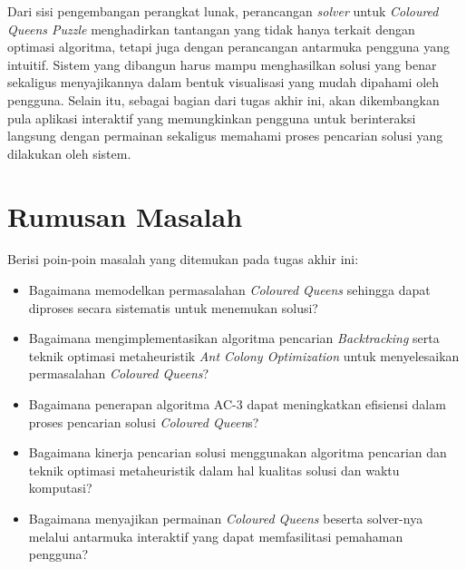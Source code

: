 \documentclass[12pt,a4paper]{article}
\begin{document}
	Dari sisi pengembangan perangkat lunak, perancangan \textit{solver} untuk \textit{Coloured Queens Puzzle} menghadirkan tantangan yang tidak hanya terkait dengan optimasi algoritma, tetapi juga dengan perancangan antarmuka pengguna yang intuitif. Sistem yang dibangun harus mampu menghasilkan solusi yang benar sekaligus menyajikannya dalam bentuk visualisasi yang mudah dipahami oleh pengguna. Selain itu, sebagai bagian dari tugas akhir ini, akan dikembangkan pula aplikasi interaktif yang memungkinkan pengguna untuk berinteraksi langsung dengan permainan sekaligus memahami proses pencarian solusi yang dilakukan oleh sistem.

	\section*{Rumusan Masalah}
	Berisi poin-poin masalah yang ditemukan pada tugas akhir ini:
	\begin{itemize}	
		\item Bagaimana memodelkan permasalahan \textit{ Coloured Queens} sehingga dapat diproses secara sistematis untuk menemukan solusi?
		
		\item Bagaimana mengimplementasikan algoritma pencarian \textit{Backtracking} serta teknik optimasi metaheuristik \textit{Ant Colony Optimization} untuk menyelesaikan permasalahan \textit{Coloured Queens}?
		
		\item Bagaimana penerapan algoritma AC-3 dapat meningkatkan efisiensi dalam proses pencarian solusi \textit{Coloured Queen}s?
		
		\item Bagaimana kinerja pencarian solusi menggunakan algoritma pencarian dan teknik optimasi metaheuristik dalam hal kualitas solusi dan waktu komputasi?
		
		\item Bagaimana menyajikan permainan \textit{Coloured Queens} beserta solver-nya melalui antarmuka interaktif yang dapat memfasilitasi pemahaman pengguna?
	\end{itemize}
	
\end{document}
